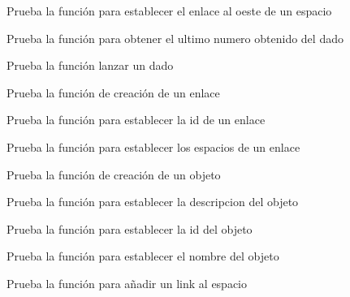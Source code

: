 \begin{DoxyRefList}
Prueba la función para establecer el enlace al oeste de un espacio  
\item[\label{test__test000005}%
\Hypertarget{test__test000005}%
Member \hyperlink{die__test_8h_a0832aa306964705770b2f1240763d962}{test2\+\_\+die\+\_\+get\+\_\+last\+\_\+roll} ()]Prueba la función para obtener el ultimo numero obtenido del dado  
\item[\label{test__test000003}%
\Hypertarget{test__test000003}%
Member \hyperlink{die__test_8h_af7df60d905acf9505f1e434c6f75d027}{test2\+\_\+die\+\_\+roll} ()]Prueba la función lanzar un dado  
\item[\label{test__test000007}%
\Hypertarget{test__test000007}%
Member \hyperlink{link__test_8h_a24b5463da176c3e578b0a0fa8bb1f9f0}{test2\+\_\+link\+\_\+create} ()]Prueba la función de creación de un enlace  
\item[\label{test__test000009}%
\Hypertarget{test__test000009}%
Member \hyperlink{link__test_8h_a2f107a28c71f764c8091747f48eaec3f}{test2\+\_\+link\+\_\+set\+\_\+id} ()]Prueba la función para establecer la id de un enlace  
\item[\label{test__test000011}%
\Hypertarget{test__test000011}%
Member \hyperlink{link__test_8h_a98a0815c982a3569c1c8be28f4e13736}{test2\+\_\+link\+\_\+set\+\_\+spaces} ()]Prueba la función para establecer los espacios de un enlace  
\item[\label{test__test000016}%
\Hypertarget{test__test000016}%
Member \hyperlink{object__test_8h_add54ab5e33a1b0a93e9ddcf73591bd9f}{test2\+\_\+object\+\_\+create} ()]Prueba la función de creación de un objeto  
\item[\label{test__test000022}%
\Hypertarget{test__test000022}%
Member \hyperlink{object__test_8h_a65e32c3642c1d9207cdd84b134c616da}{test2\+\_\+object\+\_\+set\+\_\+description} ()]Prueba la función para establecer la descripcion del objeto  
\item[\label{test__test000020}%
\Hypertarget{test__test000020}%
Member \hyperlink{object__test_8h_a1f0cfd69428a6cf954fe37c9c21f8cb3}{test2\+\_\+object\+\_\+set\+\_\+id} ()]Prueba la función para establecer la id del objeto  
\item[\label{test__test000018}%
\Hypertarget{test__test000018}%
Member \hyperlink{object__test_8h_acf42b7e7be91ede243f2aaa56c4c9347}{test2\+\_\+object\+\_\+set\+\_\+name} ()]Prueba la función para establecer el nombre del objeto  
\item[\label{test__test000069}%
\Hypertarget{test__test000069}%
Member \hyperlink{space__test_8c_a51f8484eb8b24439d5ce9b2772adc2c4}{test2\+\_\+space\+\_\+add\+\_\+link} ()]Prueba la función para añadir un link al espacio 


\end{DoxyRefList}
